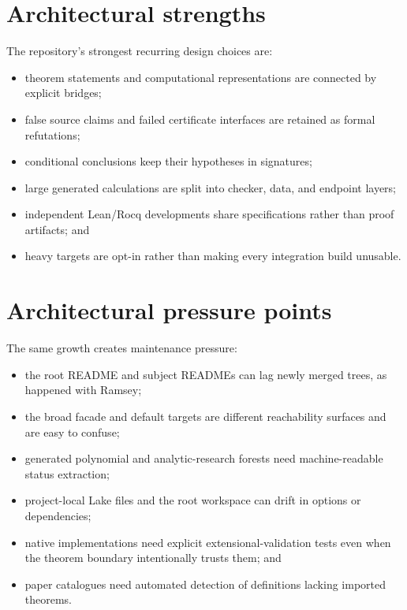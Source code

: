\documentclass[
  10pt,
  a4paper,
  twoside,
  open=any,
  parskip=half,
  headings=big
]{scrreprt}
\newcommand{\code}[1]{\texttt{\detokenize{#1}}}
\begin{document}
\section{Architectural strengths}

The repository's strongest recurring design choices are:

\begin{itemize}
  \item theorem statements and computational representations are connected by explicit bridges;
  \item false source claims and failed certificate interfaces are retained as formal refutations;
  \item conditional conclusions keep their hypotheses in signatures;
  \item large generated calculations are split into checker, data, and endpoint layers;
  \item independent Lean/Rocq developments share specifications rather than proof artifacts; and
  \item heavy targets are opt-in rather than making every integration build unusable.
\end{itemize}

\section{Architectural pressure points}

The same growth creates maintenance pressure:

\begin{itemize}
  \item the root README and subject READMEs can lag newly merged trees, as happened with Ramsey;
  \item the broad facade and default targets are different reachability surfaces and are easy to confuse;
  \item generated polynomial and analytic-research forests need machine-readable status extraction;
  \item project-local Lake files and the root workspace can drift in options or dependencies;
  \item native implementations need explicit extensional-validation tests even when the theorem boundary intentionally trusts them; and
  \item paper catalogues need automated detection of definitions lacking imported \code{_holds} theorems.
\end{itemize}
\end{document}
